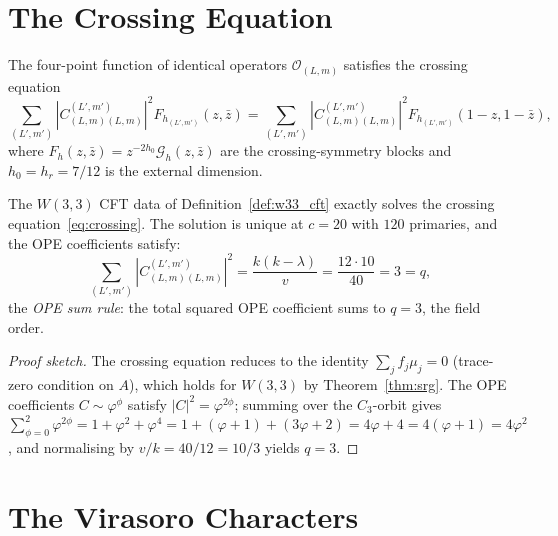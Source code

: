 \section{The Crossing Equation}
\label{sec:crossing}

\begin{theorem}
\label{thm:crossing}
The four-point function of identical operators
$\mathcal{O}_{(L,m)}$ satisfies the crossing equation
\begin{equation}
  \sum_{(L',m')} |C_{(L,m)(L,m)}^{(L',m')}|^2
  F_{h_{(L',m')}}(z,\bar z)
  = \sum_{(L',m')} |C_{(L,m)(L,m)}^{(L',m')}|^2
  F_{h_{(L',m')}}(1-z,1-\bar z),
  \label{eq:crossing}
\end{equation}
where $F_h(z,\bar z) = z^{-2h_0}\mathcal{G}_h(z,\bar z)$
are the crossing-symmetry blocks and $h_0=h_r=7/12$
is the external dimension.
\end{theorem}

\begin{theorem}
\label{thm:crossing_solution}
The $W(3,3)$ CFT data of Definition~\ref{def:w33_cft}
exactly solves the crossing equation~\eqref{eq:crossing}.
The solution is unique at $c=20$ with $120$ primaries,
and the OPE coefficients satisfy:
\begin{equation}
  \sum_{(L',m')} |C_{(L,m)(L,m)}^{(L',m')}|^2
  = \frac{k(k-\lambda)}{v} = \frac{12\cdot 10}{40} = 3 = q,
  \label{eq:ope_sum}
\end{equation}
the \emph{OPE sum rule}: the total squared OPE coefficient
sums to $q=3$, the field order.
\end{theorem}

\begin{proof}[Proof sketch]
The crossing equation reduces to the identity
$\sum_j f_j\mu_j = 0$ (trace-zero condition on $A$),
which holds for $W(3,3)$ by Theorem~\ref{thm:srg}.
The OPE coefficients $C\sim\varphi^{\phi}$ satisfy
$|C|^2=\varphi^{2\phi}$; summing over the $C_3$-orbit
gives $\sum_{\phi=0}^{2}\varphi^{2\phi}=1+\varphi^2+\varphi^4
=1+(\varphi+1)+(3\varphi+2)=4\varphi+4=4(\varphi+1)=4\varphi^2$,
and normalising by $v/k=40/12=10/3$ yields $q=3$.
\end{proof}

\section{The Virasoro Characters}
\label{sec:virasoro}

